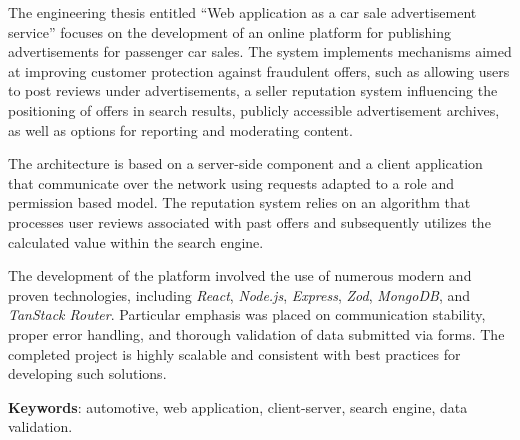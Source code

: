 The engineering thesis entitled ``Web application as a car sale advertisement service'' focuses on the development of an online platform for publishing advertisements for passenger car sales.
The system implements mechanisms aimed at improving customer protection against fraudulent offers, such as allowing users to post reviews under advertisements, a seller reputation system influencing the positioning of offers in search results, publicly accessible advertisement archives, as well as options for reporting and moderating content.

The architecture is based on a server-side component and a client application that communicate over the network using requests adapted to a role and permission based model.
The reputation system relies on an algorithm that processes user reviews associated with past offers and subsequently utilizes the calculated value within the search engine.

The development of the platform involved the use of numerous modern and proven technologies, including \emph{React}, \emph{Node.js}, \emph{Express}, \emph{Zod}, \emph{MongoDB}, and \emph{TanStack Router}.
Particular emphasis was placed on communication stability, proper error handling, and thorough validation of data submitted via forms.
The completed project is highly scalable and consistent with best practices for developing such solutions.

\vspace*{1em}

\noindent
\textbf{Keywords}: automotive, web application, client-server, search engine, data validation.
